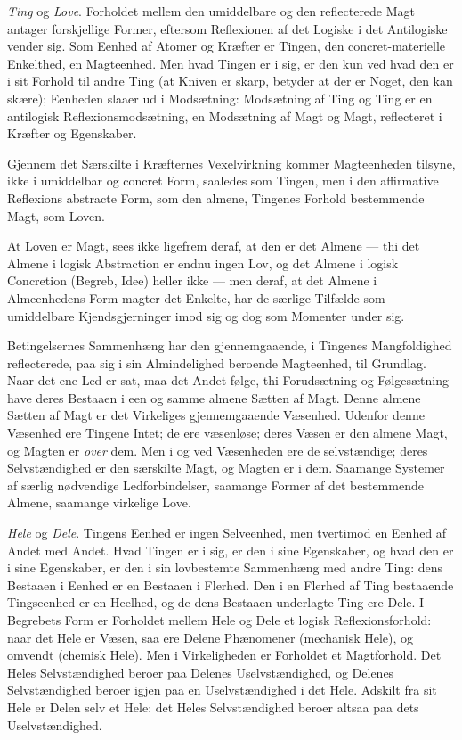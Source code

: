 \documentclass[12pt]{book}
\newcommand{\opage}[1]{\marginnote{\footnotesize\textit{[#1]}}}
\begin{document}
\emph{Ting} og \emph{Love}. Forholdet mellem den umiddelbare
og den reflecterede Magt antager forskjellige Former,
eftersom Reflexionen af det Logiske i det Antilogiske vender sig.
Som Eenhed af Atomer og Kræfter er Tingen, den
concret-materielle Enkelthed, en Magteenhed. Men hvad Tingen er
i sig, er den kun ved hvad den er i sit Forhold til andre
Ting (at Kniven er skarp, betyder at der er Noget, den kan
skære); Eenheden slaaer ud i Modsætning: Modsætning af
Ting og Ting er en antilogisk Reflexionsmodsætning, en
Modsætning af Magt og Magt, reflecteret i Kræfter og
Egenskaber.

Gjennem det Særskilte i Kræfternes Vexelvirkning
kommer Magteenheden tilsyne, ikke i umiddelbar og concret Form,
saaledes som Tingen, men i den affirmative Reflexions
abstracte Form, som den almene, Tingenes Forhold bestemmende
Magt, som Loven.

At Loven er Magt, sees ikke ligefrem deraf, at den er
det Almene --- thi det Almene i logisk Abstraction er endnu
ingen Lov, og det Almene i logisk Concretion (Begreb, Idee)
heller ikke --- men deraf, at det Almene i Almeenhedens Form
\opage{35} magter det Enkelte, har de særlige Tilfælde som umiddelbare
Kjendsgjerninger imod sig og dog som Momenter under sig.

Betingelsernes Sammenhæng har den gjennemgaaende,
i Tingenes Mangfoldighed reflecterede, paa sig i sin
Almindelighed beroende Magteenhed, til Grundlag. Naar det
ene Led er sat, maa det Andet følge, thi Forudsætning og
Følgesætning have deres Bestaaen i een og samme almene
Sætten af Magt. Denne almene Sætten af Magt er det
Virkeliges gjennemgaaende Væsenhed. Udenfor denne
Væsenhed ere Tingene Intet; de ere væsenløse; deres Væsen er den
almene Magt, og Magten er \emph{over} dem. Men i og ved
Væsenheden ere de selvstændige; deres Selvstændighed er den
særskilte Magt, og Magten er i dem. Saamange Systemer
af særlig nødvendige Ledforbindelser, saamange Former af
det bestemmende Almene, saamange virkelige Love.

\emph{Hele} og \emph{Dele}. Tingens Eenhed er ingen Selveenhed,
men tvertimod en Eenhed af Andet med Andet. Hvad
Tingen er i sig, er den i sine Egenskaber, og hvad den er i sine
Egenskaber, er den i sin lovbestemte Sammenhæng med andre
Ting: dens Bestaaen i Eenhed er en Bestaaen i Flerhed.
Den i en Flerhed af Ting bestaaende Tingseenhed er en
Heelhed, og de dens Bestaaen underlagte Ting ere Dele. I
Begrebets Form er Forholdet mellem Hele og Dele et logisk
Reflexionsforhold: naar det Hele er Væsen, saa ere Delene
Phænomener (mechanisk Hele), og omvendt (chemisk Hele). Men
i Virkeligheden er Forholdet et Magtforhold. Det Heles
Selvstændighed beroer paa Delenes Uselvstændighed, og
Delenes Selvstændighed beroer igjen paa en Uselvstændighed i det
Hele. Adskilt fra sit Hele er Delen selv et Hele: det Heles
Selvstændighed beroer altsaa paa dets Uselvstændighed.
\end{document}
